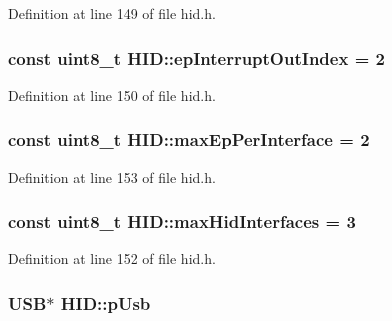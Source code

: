 \-Definition at line 149 of file hid.\-h.

\hypertarget{class_h_i_d_aeb7fc07fe6dbc98d518967fdbc441ab3}{
\subsubsection[{ep\-Interrupt\-Out\-Index}]{\setlength{\rightskip}{0pt plus 5cm}const uint8\-\_\-t {\bf \-H\-I\-D\-::ep\-Interrupt\-Out\-Index} = 2}}\label{class_h_i_d_aeb7fc07fe6dbc98d518967fdbc441ab3}


\-Definition at line 150 of file hid.\-h.

\hypertarget{class_h_i_d_acd92969682030cd5cac310dd7746c7c7}{
\subsubsection[{max\-Ep\-Per\-Interface}]{\setlength{\rightskip}{0pt plus 5cm}const uint8\-\_\-t {\bf \-H\-I\-D\-::max\-Ep\-Per\-Interface} = 2}}\label{class_h_i_d_acd92969682030cd5cac310dd7746c7c7}


\-Definition at line 153 of file hid.\-h.

\hypertarget{class_h_i_d_afe5186f46ac7b580bb3dc289e3f237b2}{
\subsubsection[{max\-Hid\-Interfaces}]{\setlength{\rightskip}{0pt plus 5cm}const uint8\-\_\-t {\bf \-H\-I\-D\-::max\-Hid\-Interfaces} = 3}}\label{class_h_i_d_afe5186f46ac7b580bb3dc289e3f237b2}


\-Definition at line 152 of file hid.\-h.

\hypertarget{class_h_i_d_a1583e665c2b930e8683c10dc271f013f}{
\subsubsection[{p\-Usb}]{\setlength{\rightskip}{0pt plus 5cm}\-U\-S\-B$\ast$ {\bf \-H\-I\-D\-::p\-Usb}}}\label{class_h_i_d_a1583e665c2b930e8683c10dc271f013f}


